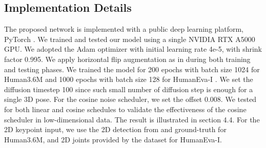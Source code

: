 \documentclass[letterpaper, 10 pt, conference]{ieeeconf}
\begin{document}
\subsection{Implementation Details}
The proposed network is implemented with a public deep learning platform, PyTorch \cite{paszke2019pytorch}.
We trained and tested our model using a single NVIDIA RTX A5000 GPU.
We adopted the Adam \cite{kingma2014adam} optimizer with initial learning rate 4e-5, with shrink factor 0.995.
We apply horizontal flip augmentation as in \cite{chen2020anatomy, Liu_2020_CVPR, pavllo20193d} during both training and testing phases.
We trained the model for 200 epochs with batch size 1024 for Human3.6M \cite{ionescu2013human3} and 1000 epochs with batch size 128 for HumanEva-I \cite{sigal2010humaneva}.
We set the diffusion timestep 100 since such small number of diffusion step is enough for a single 3D pose.
For the cosine noise scheduler, we set the offset  0.008.
We tested for both linear and cosine schedules to validate the effectiveness of the cosine scheduler in low-dimensional data.
The result is illustrated in section 4.4.
For the 2D keypoint input, we use the 2D detection from \cite{sun2019deep} and ground-truth for Human3.6M, and 2D joints provided by the dataset for HumanEva-I.
\end{document}
